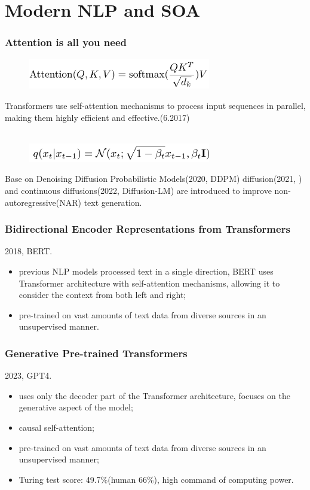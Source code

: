 \documentclass{beamer}
\begin{document}
\section{Modern NLP and SOA}
\begin{frame}
  \frametitle{Attention is all you need}
  \begin{figure}[H]
    \centering
    \includegraphics[width=8cm]{pictures/屏幕截图 2024-06-30 171741.png}
  \end{figure}
  Transformers use self-attention mechanisms to process input sequences in parallel, making them highly efficient and effective.(6.2017\cite{vaswani2023attentionneed})\\\
  \begin{figure}[H]
    \centering
    \includegraphics[width=8cm]{pictures/屏幕截图 2024-06-30 171707.png}
  \end{figure}

  Base on Denoising Diffusion Probabilistic Models(2020, DDPM\cite{ho2020denoisingdiffusionprobabilisticmodels})
  diffusion(2021, \cite{austin2023structureddenoisingdiffusionmodels}) and continuous diffusions(2022, Diffusion-LM\cite{li2022diffusionlmimprovescontrollabletext}) are introduced to improve non-autoregressive(NAR) text generation.\cite{}

\end{frame}
\begin{frame}
  \frametitle{Bidirectional Encoder Representations from Transformers}
  2018, BERT\cite{devlin2019bertpretrainingdeepbidirectional}.
  \begin{itemize}
    \item previous NLP models processed
    text in a single direction, BERT uses Transformer architecture
    with self-attention mechanisms, allowing
    it to consider the context from both left
    and right;
    \item pre-trained on vast amounts of text data from diverse sources in an unsupervised
    manner. 
  \end{itemize}
\end{frame}
\begin{frame}
  \frametitle{Generative Pre-trained Transformers}
  2023, GPT4\cite{openai2024gpt4technicalreport}.
  \begin{itemize}
    \item uses only the decoder part of the Transformer architecture, focuses on the generative aspect of the model;
    \item causal self-attention;
    \item pre-trained on vast amounts of text data from diverse sources in an unsupervised
    manner;
    \item Turing test score: 49.7\%(human 66\%), high command of computing power.
  \end{itemize}
\end{frame}
\end{document}
